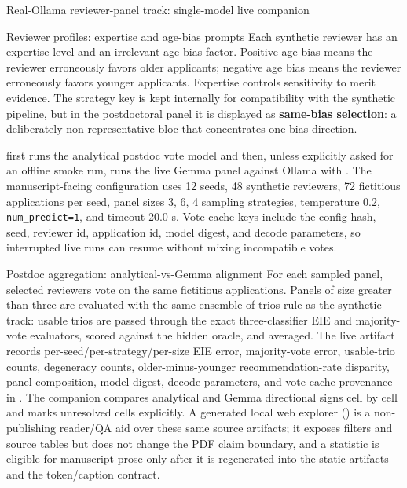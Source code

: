 \documentclass[
  ignorenonframetext,
]{beamer}
\begin{document}
\begin{frame}{Real-Ollama reviewer-panel
track: single-model live companion}
\begin{block}{Reviewer profiles: expertise and age-bias prompts}
\protect{}\label{reviewer-profiles-expertise-and-age-bias-prompts}
Each synthetic reviewer has an expertise level and an irrelevant
age-bias factor. Positive age bias means the reviewer erroneously favors
older applicants; negative age bias means the reviewer erroneously
favors younger applicants. Expertise controls sensitivity to merit
evidence. The  strategy key is kept
internally for compatibility with the synthetic pipeline, but in the
postdoctoral panel it is displayed as \textbf{same-bias selection}: a
deliberately non-representative bloc that concentrates one bias
direction.

 first runs the analytical
postdoc vote model and then, unless explicitly asked for an offline
smoke run, runs the live Gemma panel against Ollama with
. The manuscript-facing configuration uses 12
seeds, 48 synthetic reviewers, 72 fictitious applications per seed,
panel sizes 3, 6, 4 sampling strategies, temperature 0.2,
\texttt{num\_predict=1}, and timeout 20.0 s. Vote-cache keys include the
config hash, seed, reviewer id, application id, model digest, and decode
parameters, so interrupted live runs can resume without mixing
incompatible votes.
\end{block}

\begin{block}{Postdoc aggregation: analytical-vs-Gemma alignment}
\protect{}\label{postdoc-aggregation-analytical-vs-gemma-alignment}
For each sampled panel, selected reviewers vote on the same fictitious
applications. Panels of size greater than three are evaluated with the
same ensemble-of-trios rule as the synthetic track: usable trios are
passed through the exact three-classifier EIE and majority-vote
evaluators, scored against the hidden oracle, and averaged. The live
artifact records per-seed/per-strategy/per-size EIE error, majority-vote
error, usable-trio counts, degeneracy counts, older-minus-younger
recommendation-rate disparity, panel composition, model digest, decode
parameters, and vote-cache provenance in
. The companion
 compares analytical
and Gemma directional signs cell by cell and marks unresolved cells
explicitly. A generated local web explorer
() is a non-publishing reader/QA
aid over these same source artifacts; it exposes filters and source
tables but does not change the PDF claim boundary, and a statistic is
eligible for manuscript prose only after it is regenerated into the
static artifacts and the token/caption contract.
\end{block}
\end{frame}
\end{document}
